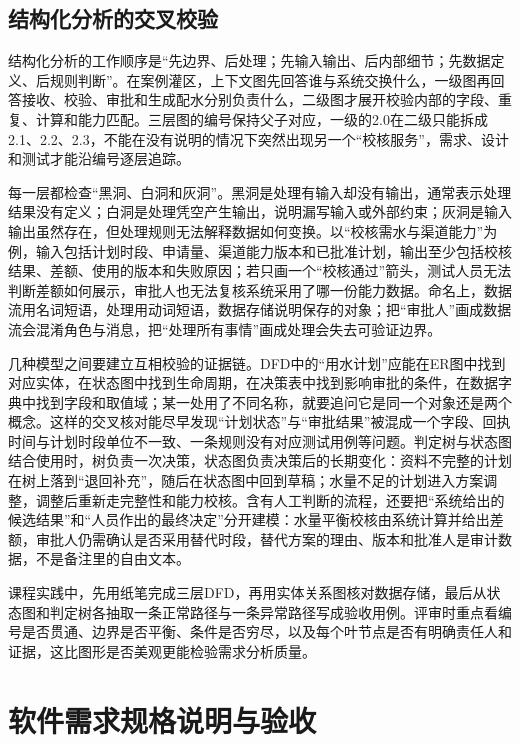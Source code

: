 \subsection{结构化分析的交叉校验}

结构化分析的工作顺序是“先边界、后处理；先输入输出、后内部细节；先数据定义、后规则判断”。在案例灌区，上下文图先回答谁与系统交换什么，一级图再回答接收、校验、审批和生成配水分别负责什么，二级图才展开校验内部的字段、重复、计算和能力匹配。三层图的编号保持父子对应，一级的2.0在二级只能拆成2.1、2.2、2.3，不能在没有说明的情况下突然出现另一个“校核服务”，需求、设计和测试才能沿编号逐层追踪。

每一层都检查“黑洞、白洞和灰洞”。黑洞是处理有输入却没有输出，通常表示处理结果没有定义；白洞是处理凭空产生输出，说明漏写输入或外部约束；灰洞是输入输出虽然存在，但处理规则无法解释数据如何变换。以“校核需水与渠道能力”为例，输入包括计划时段、申请量、渠道能力版本和已批准计划，输出至少包括校核结果、差额、使用的版本和失败原因；若只画一个“校核通过”箭头，测试人员无法判断差额如何展示，审批人也无法复核系统采用了哪一份能力数据。命名上，数据流用名词短语，处理用动词短语，数据存储说明保存的对象；把“审批人”画成数据流会混淆角色与消息，把“处理所有事情”画成处理会失去可验证边界。

几种模型之间要建立互相校验的证据链。DFD中的“用水计划”应能在ER图中找到对应实体，在状态图中找到生命周期，在决策表中找到影响审批的条件，在数据字典中找到字段和取值域；某一处用了不同名称，就要追问它是同一个对象还是两个概念。这样的交叉核对能尽早发现“计划状态”与“审批结果”被混成一个字段、回执时间与计划时段单位不一致、一条规则没有对应测试用例等问题。判定树与状态图结合使用时，树负责一次决策，状态图负责决策后的长期变化：资料不完整的计划在树上落到“退回补充”，随后在状态图中回到草稿；水量不足的计划进入方案调整，调整后重新走完整性和能力校核。含有人工判断的流程，还要把“系统给出的候选结果”和“人员作出的最终决定”分开建模：水量平衡校核由系统计算并给出差额，审批人仍需确认是否采用替代时段，替代方案的理由、版本和批准人是审计数据，不是备注里的自由文本。

课程实践中，先用纸笔完成三层DFD，再用实体关系图核对数据存储，最后从状态图和判定树各抽取一条正常路径与一条异常路径写成验收用例。评审时重点看编号是否贯通、边界是否平衡、条件是否穷尽，以及每个叶节点是否有明确责任人和证据，这比图形是否美观更能检验需求分析质量。

\section{软件需求规格说明与验收}

